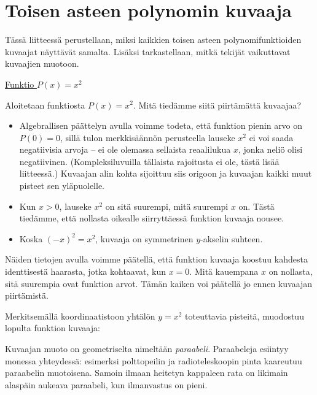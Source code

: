 \section*{Toisen asteen polynomin kuvaaja}

Tässä liitteessä perustellaan, miksi kaikkien toisen asteen polynomifunktioiden kuvaajat näyttävät samalta. Lisäksi tarkastellaan, mitkä tekijät vaikuttavat kuvaajien muotoon.

\underline{Funktio $P(x)=x^2$}

Aloitetaan funktiosta $P(x)=x^2$. Mitä tiedämme siitä piirtämättä kuvaajaa?
\begin{itemize}
\item Algebrallisen päättelyn avulla voimme todeta, että funktion pienin arvo on $P(0) = 0$, sillä tulon merkkisäännön perusteella lauseke $x^2$ ei voi saada negatiivisia arvoja – ei ole olemassa sellaista reaalilukua $x$, jonka neliö olisi negatiivinen. (Kompleksiluvuilla tällaista rajoitusta ei ole, tästä lisää liitteessä.) Kuvaajan alin kohta sijoittuu siis origoon ja kuvaajan kaikki muut pisteet sen yläpuolelle.
\item Kun $x > 0$, lauseke $x^2$  on sitä
suurempi, mitä suurempi $x$ on. Tästä tiedämme, että nollasta oikealle siirryttäessä funktion kuvaaja nousee.
\item Koska $(-x)^2 = x^2$, kuvaaja on symmetrinen $y$-akselin suhteen.
\end{itemize}

Näiden tietojen avulla voimme päätellä, että funktion kuvaaja koostuu kahdesta
identtisestä haarasta, jotka kohtaavat, kun $x=0$. Mitä kauempana $x$ on nollasta, sitä suurempia ovat funktion arvot. Tämän kaiken voi päätellä jo ennen kuvaajan piirtämistä.

Merkitsemällä koordinaatistoon yhtälön $y=x^2$ toteuttavia pisteitä, muodostuu lopulta funktion kuvaaja:
\begin{center}
\begin{kuvaajapohja}{2}{-2}{2}{-1}{4}
\end{kuvaajapohja}
\end{center}

Kuvaajan muoto on geometriselta nimeltään \emph{paraabeli}. Paraabeleja esiintyy monessa yhteydessä: esimerksi polttopeilin ja radioteleskoopin pinta kaareutuu paraabelin muotoisena. Samoin ilmaan heitetyn kappaleen rata on likimain alaspäin aukeava paraabeli, kun ilmanvastus on pieni.

